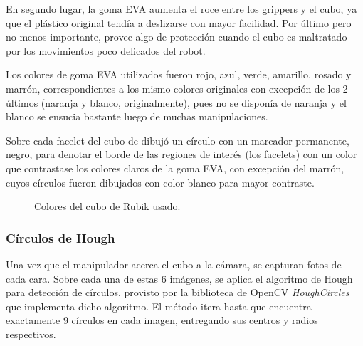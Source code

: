 En segundo lugar, la goma EVA aumenta el roce entre los grippers y el cubo, ya que el plástico original tendía a deslizarse con mayor facilidad. Por último pero no menos importante, provee algo de protección cuando el cubo es maltratado por los movimientos poco delicados del robot.

Los colores de goma EVA utilizados fueron rojo, azul, verde, amarillo, rosado y marrón, correspondientes a los mismo colores originales con excepción de los $2$ últimos (naranja y blanco, originalmente), pues no se disponía de naranja y  el blanco se ensucia bastante luego de muchas manipulaciones.

Sobre cada facelet del cubo de dibujó un círculo con un marcador permanente, negro, para denotar el borde de las regiones de interés (los facelets) con un color que contrastase los colores claros de la goma EVA, con excepción del marrón, cuyos círculos fueron dibujados con color blanco para mayor contraste.

\begin{figure}[h!]
	\centering
	\hfill
	\hfill
	\hfill
	\caption{Colores del cubo de Rubik usado.}
	\label{colorescubo}
\end{figure}

\subsubsection{Círculos de Hough}
Una vez que el manipulador acerca el cubo a la cámara, se capturan fotos de cada cara. Sobre cada una de estas $6$ imágenes, se aplica el algoritmo de Hough para detección de círculos, provisto por la biblioteca de OpenCV \textit{HoughCircles} que implementa dicho algoritmo. El método itera hasta que encuentra exactamente $9$ círculos en cada imagen, entregando sus centros y radios respectivos.

